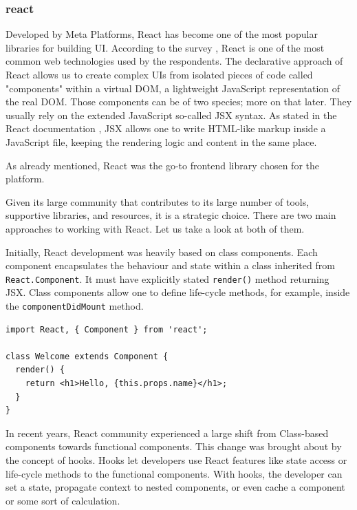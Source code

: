 \subsubsection{\gls{react}}
Developed by Meta Platforms, React has become one of the most popular libraries for building \ac{UI}.
According to the survey \cite{StackOverflow2023}, React is one of the most common web technologies used by the respondents.
The declarative approach of React allows us to create complex \ac{UI}s from isolated pieces of code called "components" \cite{react-docs} within a virtual \ac{DOM}, a lightweight JavaScript representation of the real \ac{DOM}.
Those components can be of two species; more on that later.
They usually rely on the extended JavaScript so-called JSX syntax.
As stated in the React documentation \cite{JSX-react-docs}, JSX allows one to write HTML-like markup inside a JavaScript file, keeping the rendering logic and content in the same place.

As already mentioned, React was the go-to frontend library chosen for the platform. 

Given its large community that contributes to its large number of tools, supportive libraries, and resources, it is a strategic choice.
There are two main approaches to working with React. Let us take a look at both of them.

\label{subsubsub:class-components}
Initially, React development was heavily based on class components.
Each component encapsulates the behaviour and state within a class inherited from \texttt{React.Component}.
It must have explicitly stated \texttt{render()} method returning JSX.
Class components allow one to define life-cycle methods, for example, inside the \texttt{componentDidMount} method.

\medskip
\begin{lstlisting}[caption=React class based component exmaple]
import React, { Component } from 'react';

class Welcome extends Component {
  render() {
    return <h1>Hello, {this.props.name}</h1>;
  }
}
\end{lstlisting}


\label{subsubsub:functional-components}
In recent years, React community experienced a large shift from Class-based components towards functional components.
This change was brought about by the concept of hooks. 
Hooks let developers use React features like state access or life-cycle methods to the functional components.
With hooks, the developer can set a state, propagate context to nested components, or even cache a component or some sort of calculation.

